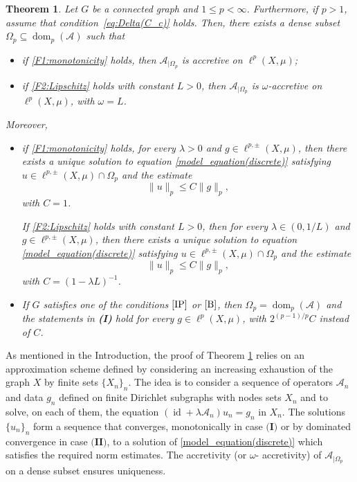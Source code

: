 \documentclass[journal]{article}
\newtheorem{theorem}{Theorem}[section]
\theoremstyle{nonitalic}
\theoremstyle{nonitalic}
\theoremstyle{plain} %
\numberwithin{equation}{section}
\newcommand{\dom}{\operatorname{dom}}
\begin{document}
\begin{theorem}\label{th: F1}
	Let $G$ be a connected graph and $1\leq p <\infty$. Furthermore, if $p>1$, assume that condition~\eqref{eq:Delta(C_c)} holds. Then, there exists a dense subset $\Omega_p \subseteq \dom_p(\mathcal{A})$ such that
\begin{itemize} 
\item 
if \textnormal{\ref{F1:monotonicity}} holds, then $\mathcal{A}_{|\Omega_p}$ is accretive on $\ell^p(X,\mu)$;
\item 
if \textnormal{\ref{F2:Lipschitz}} holds with constant $L>0$, then $\mathcal{\mathcal A}_{|\Omega_p}$ is $\omega$-accretive on $\ell^p(X,\mu)$, with $\omega = L$.
\end{itemize}

Moreover,
\begin{itemize}
\item[\textnormal{\textbf{(I)}}] if \textnormal{\ref{F1:monotonicity}} holds, for every $\lambda >0$ and $g \in \ell^{p,\pm}(X,\mu)$, then there exists a unique solution to equation \eqref{model_equation(discrete)} satisfying $u \in \ell^{p,\pm}(X,\mu)\cap\Omega_p$
and the estimate  
\begin{equation}\label{contractivity}
    \|u\|_p\leq C \|g\|_p,
\end{equation}
with $C=1$.


If \textnormal{\ref{F2:Lipschitz}} holds with constant $L>0$, then for every $\lambda \in (0,1/L)$ and $g \in \ell^{p,\pm}(X,\mu)$, then there exists a unique solution to equation \eqref{model_equation(discrete)} satisfying $u \in \ell^{p,\pm}(X,\mu)\cap\Omega_p$ 
and the estimate  
\begin{equation}\label{contractivitybis}
    \|u\|_p\leq C \|g\|_p,
\end{equation}
with $C=(1-\lambda L)^{-1}$.  

\item[\textnormal{\textbf{(II)}}] If $G$ satisfies one of the conditions $\textnormal{\ref{IP}}$ or $\textnormal{\ref{B}}$, then $\Omega_p=\dom_p(\mathcal{A})$ and the  statements in \textnormal{\textbf{(I)}} hold for every $g\in \ell^p(X,\mu)$, with $2^{(p-1)/p}C$ instead of $C$.
\end{itemize}
\end{theorem}
As mentioned in the Introduction, the proof of Theorem \ref{th: F1} relies on an approximation scheme defined by considering an increasing exhaustion of the graph $X$ by finite sets $\{X_n\}_n$. The idea is to consider a sequence of operators $\mathcal{A}_n$ and data $g_n$ defined on finite Dirichlet subgraphs with nodes sets $X_n$ and to solve, on each of them, the equation $(\operatorname{id} + \lambda \mathcal{A}_n)u_n = g_n$ in $X_n$. The solutions $\{u_n\}_n$ form a sequence that converges, monotonically in case $\textbf{(I)}$ or by dominated convergence in case $\textbf{(II)}$, to a solution of \eqref{model_equation(discrete)} which satisfies the required norm estimates.  The accretivity (or $\omega$- accretivity) of $\mathcal{A}_{|\Omega_p}$ on a dense subset ensures uniqueness.
\end{document}
